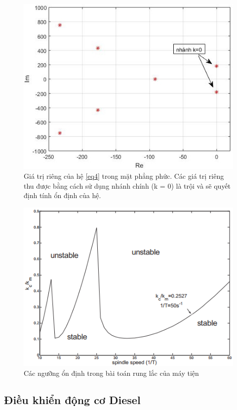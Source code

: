 \documentclass[10pt,notheorems]{beamer}
\theoremstyle{definition}
\theoremstyle{definition}
\theoremstyle{definition}
\begin{document}
\begin{frame}
	\begin{figure}[h!]
		\centering
		\includegraphics[width=0.7\linewidth]{hinh/spectrum_chatter-2}
		\caption{Giá trị riêng của hệ \eqref{eq4} trong mặt phẳng phức. Các giá trị riêng thu được bằng cách sử dụng nhánh chính (k = 0) là trội và sẽ quyết định tính ổn định của hệ.}
		\label{spectrumchatter-2}
	\end{figure}
\end{frame}

\begin{frame}
	\begin{figure}[h!]
		\centering
		\includegraphics[width=0.8\linewidth]{hinh/stability-lobes}
		\caption{Các ngưỡng ổn định trong bài toán rung lắc của máy tiện}
		\label{fig:stability-lobes}
	\end{figure}
\end{frame}


\subsection{Điều khiển động cơ Diesel}
\end{document}
